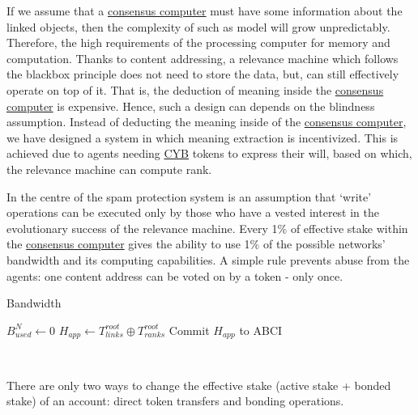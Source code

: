 \documentclass[8pt,oneside]{amsart}
\begin{document}
If we assume that a {\hyperref[consensus-computer]{consensus computer}} must have some information about the linked objects, then the complexity of such as model will grow unpredictably. Therefore, the high requirements of the processing computer for memory and computation. Thanks to content addressing, a relevance machine which follows the blackbox principle does not need to store the data, but, can still effectively operate on top of it. That is, the deduction of meaning inside the {\hyperref[consensus-computer]{consensus computer}} is expensive. Hence, such a design can depends on the blindness assumption. Instead of deducting the meaning inside of the {\hyperref[consensus-computer]{consensus computer}}, we have designed a system in which meaning extraction is incentivized. This is achieved due to agents needing {\hyperref[cyb]{CYB}} tokens to express their will, based on which, the relevance machine can compute rank.

In the centre of the spam protection system is an assumption that ‘write’ operations can be executed only by those who have a vested interest in the evolutionary success of the relevance machine. Every 1\% of effective stake within the {\hyperref[consensus-computer]{consensus computer}} gives the ability to use 1\% of the possible networks' bandwidth and its computing capabilities. A simple rule prevents abuse from the agents: one content address can be voted on by a token - only once.

\begin{algorithm}
\caption{Bandwidth}\label{bandwidth-algo}
$B^{N}_{used} \leftarrow 0$\;
\BlankLine
$H_{app} \leftarrow T^{root}_{links} \oplus T^{root}_{ranks}$\;
Commit $H_{app}$ to ABCI\;
\end{algorithm}\

There are only two ways to change the effective stake (active stake + bonded stake) of an account: direct token transfers and bonding operations.
\end{document}
